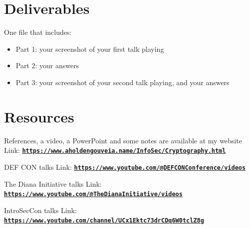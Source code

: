 \documentclass[12pt]{article}
\begin{document}
\section*{Deliverables}
One file that includes:
\begin{itemize}
    \item Part 1: your screenshot of your first talk playing
    \item Part 2: your answers
    \item Part 3: your screenshot of your second talk playing, and your answers
\end{itemize}

\section*{Resources}
References, a video, a PowerPoint and some notes are available at my website
Link: \href{https://www.aholdengouveia.name/InfoSec/Cryptography.html}{\textbf{\nolinkurl{https://www.aholdengouveia.name/InfoSec/Cryptography.html}}}

DEF CON talks
Link: \href{https://www.youtube.com/@DEFCONConference/videos}{\textbf{\nolinkurl{https://www.youtube.com/@DEFCONConference/videos}}}

The Diana Initiative talks
Link: \href{https://www.youtube.com/@TheDianaInitiative/videos}{\textbf{\nolinkurl{https://www.youtube.com/@TheDianaInitiative/videos}}}

IntroSecCon talks
Link: \href{https://www.youtube.com/channel/UCx1Ektc73drCDq6W0tclZ8g}{\textbf{\nolinkurl{https://www.youtube.com/channel/UCx1Ektc73drCDq6W0tclZ8g}}}
\end{document}
